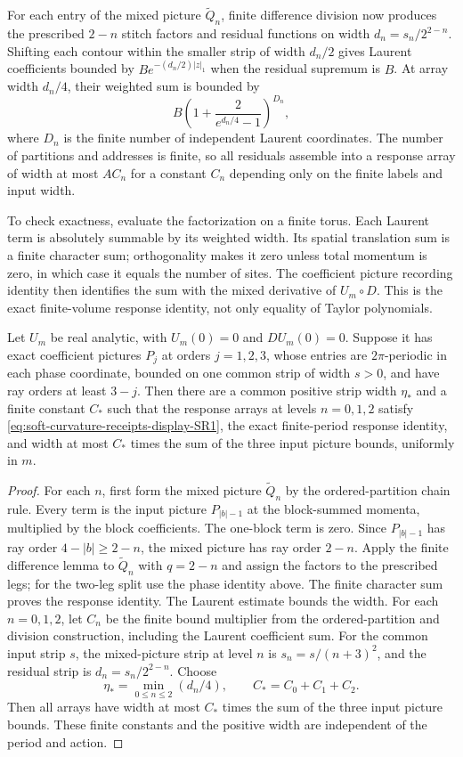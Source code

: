 For each entry of the mixed picture $\widetilde Q_n$, finite difference
division now produces the prescribed $2-n$ stitch factors and residual
functions on width $d_n=s_n/2^{2-n}$. Shifting each contour within the
smaller strip of width $d_n/2$ gives Laurent coefficients bounded by
$B e^{-(d_n/2)|z|_1}$ when the residual supremum is $B$. At array width
$d_n/4$, their weighted sum is bounded by
\[
 B\left(1+\frac{2}{e^{d_n/4}-1}\right)^{D_n},
\]
where $D_n$ is the finite number of independent Laurent coordinates.
The number of partitions and addresses is finite, so all residuals
assemble into a response array of width at most $A C_n$ for a constant
$C_n$ depending only on the finite labels and input width.

To check exactness, evaluate the factorization on a finite torus. Each
Laurent term is absolutely summable by its weighted width. Its spatial
translation sum is a finite character sum; orthogonality makes it zero
unless total momentum is zero, in which case it equals the number of
sites. The coefficient picture recording identity then identifies the
sum with the mixed derivative of $U_m\circ D$. This is the exact
finite-volume response identity, not only equality of Taylor polynomials.

\begin{proposition}
\label{prop:ex-three-level-conversion}
Let $U_m$ be real analytic, with $U_m(0)=0$ and $DU_m(0)=0$. Suppose it
has exact coefficient pictures $P_j$ at orders $j=1,2,3$, whose entries
are $2\pi$-periodic in each phase coordinate, bounded on one common strip
of width $s>0$, and have ray orders at least $3-j$. Then there
are a common positive strip
width $\eta_*$ and a finite constant $C_*$ such that the response arrays
at levels $n=0,1,2$ satisfy \eqref{eq:soft-curvature-receipts-display-SR1}, the exact finite-period response
identity, and width at most $C_*$ times the sum of the three input
picture bounds, uniformly in $m$.
\end{proposition}

\begin{proof}
For each $n$, first form the mixed picture $\widetilde Q_n$ by the
ordered-partition chain rule. Every term is the input picture
$P_{|b|-1}$ at the block-summed momenta, multiplied by the block
coefficients. The one-block term is zero. Since $P_{|b|-1}$ has ray
order $4-|b|\geq2-n$, the mixed picture has ray order $2-n$. Apply the
finite difference lemma to $\widetilde Q_n$ with $q=2-n$ and assign the
factors to the prescribed legs; for the two-leg split use the phase
identity above. The finite character sum proves the response identity.
The Laurent estimate bounds the width. For each $n=0,1,2$, let $C_n$ be the finite bound multiplier from the
ordered-partition and division construction, including the Laurent
coefficient sum. For the common input strip $s$, the mixed-picture strip at
level $n$ is $s_n=s/(n+3)^2$, and the residual strip is
$d_n=s_n/2^{2-n}$. Choose
\[
 \eta_* =\min_{0\leq n\leq2}(d_n/4),\qquad
 C_*=C_0+C_1+C_2.
\]
Then all arrays have width at most $C_*$ times the sum of the three input
picture bounds. These finite constants and the positive width are
independent of the period and action.
\end{proof}

